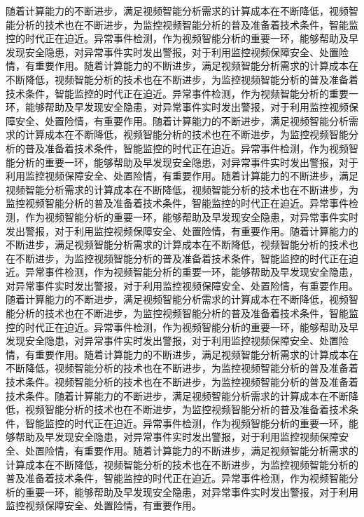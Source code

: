   随着计算能力的不断进步，满足视频智能分析需求的计算成本在不断降低，视频智能分析的技术也在不断进步，为监控视频智能分析的普及准备着技术条件，智能监控的时代正在迫近。异常事件检测，作为视频智能分析的重要一环，能够帮助及早发现安全隐患，对异常事件实时发出警报，对于利用监控视频保障安全、处置险情，有重要作用。随着计算能力的不断进步，满足视频智能分析需求的计算成本在不断降低，视频智能分析的技术也在不断进步，为监控视频智能分析的普及准备着技术条件，智能监控的时代正在迫近。异常事件检测，作为视频智能分析的重要一环，能够帮助及早发现安全隐患，对异常事件实时发出警报，对于利用监控视频保障安全、处置险情，有重要作用。随着计算能力的不断进步，满足视频智能分析需求的计算成本在不断降低，视频智能分析的技术也在不断进步，为监控视频智能分析的普及准备着技术条件，智能监控的时代正在迫近。异常事件检测，作为视频智能分析的重要一环，能够帮助及早发现安全隐患，对异常事件实时发出警报，对于利用监控视频保障安全、处置险情，有重要作用。随着计算能力的不断进步，满足视频智能分析需求的计算成本在不断降低，视频智能分析的技术也在不断进步，为监控视频智能分析的普及准备着技术条件，智能监控的时代正在迫近。异常事件检测，作为视频智能分析的重要一环，能够帮助及早发现安全隐患，对异常事件实时发出警报，对于利用监控视频保障安全、处置险情，有重要作用。随着计算能力的不断进步，满足视频智能分析需求的计算成本在不断降低，视频智能分析的技术也在不断进步，为监控视频智能分析的普及准备着技术条件，智能监控的时代正在迫近。异常事件检测，作为视频智能分析的重要一环，能够帮助及早发现安全隐患，对异常事件实时发出警报，对于利用监控视频保障安全、处置险情，有重要作用。随着计算能力的不断进步，满足视频智能分析需求的计算成本在不断降低，视频智能分析的技术也在不断进步，为监控视频智能分析的普及准备着技术条件，智能监控的时代正在迫近。异常事件检测，作为视频智能分析的重要一环，能够帮助及早发现安全隐患，对异常事件实时发出警报，对于利用监控视频保障安全、处置险情，有重要作用。随着计算能力的不断进步，满足视频智能分析需求的计算成本在不断降低，视频智能分析的技术也在不断进步，为监控视频智能分析的普及准备着技术条件。视频智能分析的技术也在不断进步，为监控视频智能分析的普及准备着技术条件。随着计算能力的不断进步，满足视频智能分析需求的计算成本在不断降低，视频智能分析的技术也在不断进步，为监控视频智能分析的普及准备着技术条件，智能监控的时代正在迫近。异常事件检测，作为视频智能分析的重要一环，能够帮助及早发现安全隐患，对异常事件实时发出警报，对于利用监控视频保障安全、处置险情，有重要作用。随着计算能力的不断进步，满足视频智能分析需求的计算成本在不断降低，视频智能分析的技术也在不断进步，为监控视频智能分析的普及准备着技术条件，智能监控的时代正在迫近。异常事件检测，作为视频智能分析的重要一环，能够帮助及早发现安全隐患，对异常事件实时发出警报，对于利用监控视频保障安全、处置险情，有重要作用。
